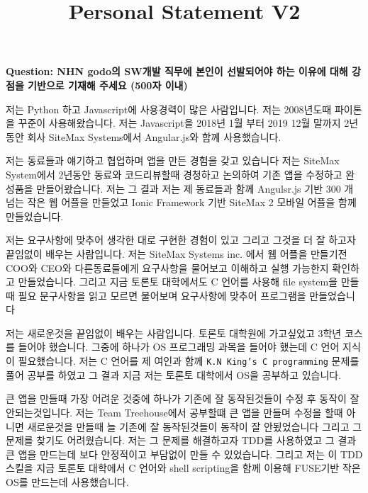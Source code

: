 \documentclass[12pt]{article}
\begin{document}
\title{Personal Statement V2}
\maketitle

\textbf{Question: NHN godo의 SW개발 직무에 본인이 선발되어야 하는 이유에 대해 강점을 기반으로 기재해 주세요 (500자 이내)}

\bigskip


\bigskip

저는 Python 하고 Javascript에 사용경력이 많은 사람입니다. 저는 2008년도때 파이톤을 꾸준이 사용해왔습니다. 저는 Javascript을 2018년 1월 부터 2019 12월 말까지 2년동안 회사 SiteMax Systems에서 Angular.js와 함께 사용했습니다.

\bigskip

저는 동료들과 얘기하고 협업하며 앱을 만든 경험을 갖고 있습니다 저는 SiteMax System에서 2년동안 동료와 코드리뷰할때 경청하고 논의하여 기존 앱을 수정하고 완성품을 만들어왔습니다.
저는 그 결과 저는 제 동료들과 함께 Angulsr.js 기반 300 개 넘는 작은 웹 어플을 만들었고 Ionic Framework 기반 SiteMax 2 모바일 어플을 함께 만들었습니다.

\bigskip

저는 요구사항에 맞추어 생각한 대로 구현한 경험이 있고 그리고 그것을 더 잘 하고자 끝임없이 배우는 사람입니다.
저는 SiteMax Systems inc. 에서 웹 어플을 만들기전 COO와 CEO와 다른동료들에게 요구사항을 물어보고 이해하고 실행 가능한지 확인하고 만들었습니다.
그리고 지금 토론토 대학에서도 C 언어를 사용해 file system을 만들때 필요 문구사항을 읽고 모르면 물어보며 요구사항에 맞추어 프로그램을 만들었습니다

\bigskip

저는 새로운것을 끝임없이 배우는 사람입니다.
토론토 대학원에 가고싶었고 3학년 코스를 들어야 했습니다.
그중에 하나가 OS 프로그래밍 과목을 들어야 했는데 C 언어 지식이 필요했습니다.
저는 C 언어를 제 여인과 함께 \texttt{K.N King's C programming} 문제를 풀어 공부를 하였고 그 결과 지금 저는 토론토 대학에서 OS을 공부하고 있습니다.

\bigskip

큰 앱을 만들때 가장 어려운 것중에 하나가 기존에 잘 동작된것들이 수정 후 동작이 잘 안되는것입니다.
저는 Team Treehouse에서 공부할떄 큰 앱을 만들며 수정을 할때 아니면 새로운것을 만들때 늘 기존에 잘 동작된것들이 동작이 잘 안됬었습니다 그리고 그 문제를 찾기도 어려웠습니다.
저는 그 문제를 해결하고자 TDD를 사용하였고 그 결과 큰 앱을 만드는데 보다 안정적이고 부담없이 만들 수 있었습니다.
그리고 저는 이 TDD 스킬을 지금 토론토 대학에서 C 언어와 shell scripting을 함께 이용해 FUSE기반 작은 OS를 만드는데 사용했습니다.
\end{document}
